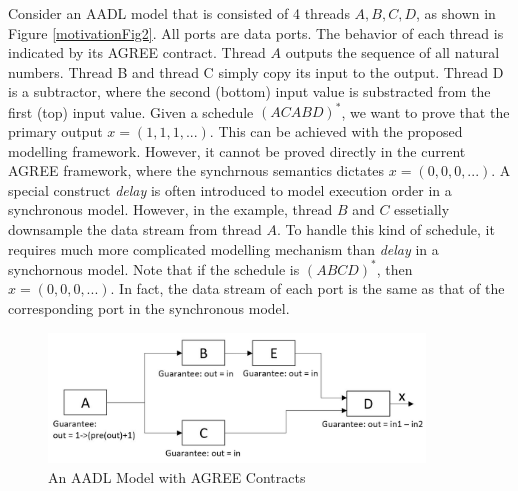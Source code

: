 Consider an AADL model that is consisted of 4 threads $A,B,C,D$, as shown in Figure \ref{motivationFig2}. All ports are data ports. The behavior of each thread is indicated by its AGREE contract. Thread $A$ outputs the sequence of all natural numbers. Thread B and thread C simply copy its input to the output. Thread D is a subtractor, where the second (bottom) input value is substracted from the first (top) input value. Given a schedule $(ACABD)^*$, we want to prove that the primary output $x = (1,1,1,...)$. This can be achieved with the proposed modelling framework. However, it cannot be proved directly in the current AGREE framework, where the synchrnous semantics dictates $x= (0,0,0,...)$. A special construct \emph{delay} is often introduced to model execution order in a synchronous model. However, in the example, thread $B$ and $C$ essetially downsample the data stream from thread $A$. To handle this kind of schedule, it requires much more complicated modelling mechanism than \emph{delay} in a synchornous model. Note that if the schedule is $(ABCD)^*$, then $x=(0,0,0,...)$. In fact, the data stream of each port is the same as that of the corresponding port in the synchronous model.

\begin{figure}[ht!]
\centering
\includegraphics[width=100mm]{MotivationalExample2.jpg}
\caption{An AADL Model with AGREE Contracts\label{motivation1}}
\end{figure}
